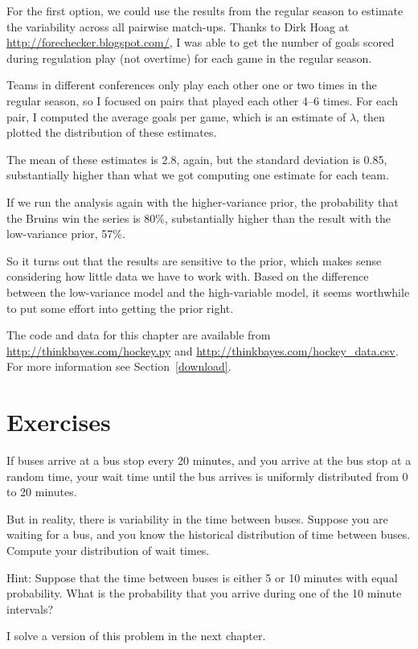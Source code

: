 \documentclass[12pt]{book}
\begin{document}
For the first option, we could use the results from the regular season
to estimate the variability across all pairwise match-ups.  Thanks to
Dirk Hoag at \url{http://forechecker.blogspot.com/}, I was able to get
the number of goals scored during regulation play (not overtime) for
each game in the regular season.

Teams in different conferences only play each other one or two
times in the regular season, so I focused on pairs that played
each other 4--6 times.  For each pair, I computed the average
goals per game, which is an estimate of $\lambda$, then plotted
the distribution of these estimates.

The mean of these estimates is 2.8, again, but the standard
deviation is 0.85, substantially higher than what we got computing
one estimate for each team.

If we run the analysis again with the higher-variance prior, the
probability that the Bruins win the series is 80\%, substantially
higher than the result with the low-variance prior, 57\%.

So it turns out that the results are sensitive to the prior, which
makes sense considering how little data we have to work with.  Based
on the difference between the low-variance model and the high-variable
model, it seems worthwhile to put some effort into getting the prior
right.

The code and data for this chapter are available from
\url{http://thinkbayes.com/hockey.py} and
\url{http://thinkbayes.com/hockey_data.csv}.
  For more information
see Section~\ref{download}.

\section{Exercises}

\begin{exercise}

If buses arrive at a bus stop every 20 minutes, and you
arrive at the bus stop at a random time, your wait time until
the bus arrives is uniformly distributed from 0 to 20 minutes.

But in reality, there is variability in the time between
buses.  Suppose you are waiting for a bus, and you know the historical
distribution of time between buses.  Compute your distribution
of wait times.

Hint: Suppose that the time between buses is either
5 or 10 minutes with equal probability.  What is the probability
that you arrive during one of the 10 minute intervals?

I solve a version of this problem in the next chapter.

\end{exercise}
\end{document}
